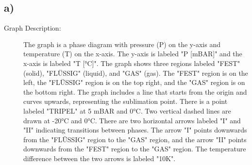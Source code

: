 

\subsection*{a)}

\begin{description}
    \item[Graph Description:] The graph is a phase diagram with pressure (P) on the y-axis and temperature (T) on the x-axis. The y-axis is labeled "P [mBAR]" and the x-axis is labeled "T [°C]". The graph shows three regions labeled "FEST" (solid), "FLÜSSIG" (liquid), and "GAS" (gas). The "FEST" region is on the left, the "FLÜSSIG" region is on the top right, and the "GAS" region is on the bottom right. The graph includes a line that starts from the origin and curves upwards, representing the sublimation point. There is a point labeled "TRIPEL" at 5 mBAR and 0°C. Two vertical dashed lines are drawn at -20°C and 0°C. There are two horizontal arrows labeled "I" and "II" indicating transitions between phases. The arrow "I" points downwards from the "FLÜSSIG" region to the "GAS" region, and the arrow "II" points downwards from the "FEST" region to the "GAS" region. The temperature difference between the two arrows is labeled "10K".
\end{description}